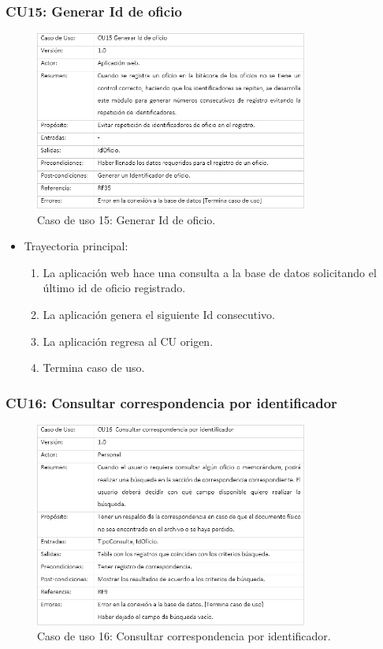 		\subsubsection{CU15: Generar Id de oficio}
\begin{figure}[htbp!]
		\centering
			\includegraphics[width=0.8\textwidth]{images/CU/CU15}
		\caption{Caso de uso 15: Generar Id de oficio.}
		\label{Tabla}
	\end{figure}
	
\begin{itemize}
	\item Trayectoria principal:
	\begin{enumerate}
		\item 	La aplicación web hace una consulta a la base de datos solicitando el último id de oficio registrado.
\item	La aplicación genera el siguiente Id consecutivo.
\item	La aplicación regresa al CU origen. 
\item	Termina caso de uso.

	\end{enumerate}
	
\end{itemize}
\newpage
		\subsubsection{CU16: Consultar correspondencia por identificador}
\begin{figure}[htbp!]
		\centering
			\includegraphics[width=0.8\textwidth]{images/CU/CU16}
		\caption{Caso de uso 16: Consultar correspondencia por identificador.}
		\label{Tabla}
	\end{figure}
	
